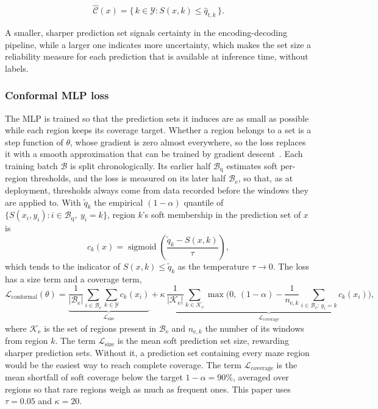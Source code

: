 \documentclass{article}
\begin{document}
\begin{equation}
  \widehat{\mathcal{C}}(x)
  =
  \{\,k\in\mathcal{Y}: S(x,k)\le \hat q_{t,k}\,\}.
\end{equation}

A smaller, sharper prediction set signals certainty in the encoding-decoding pipeline, while a larger one indicates more uncertainty, which makes the set size a reliability measure for each prediction that is available at inference time, without labels.

\subsubsection{Conformal MLP loss}
\label{sec:conformal-loss}
The MLP is trained so that the prediction sets it induces are as small as possible while each region keeps its coverage target. Whether a region belongs to a set is a step function of $\theta$, whose gradient is zero almost everywhere, so the loss replaces it with a smooth approximation that can be trained by gradient descent~\cite{stutz2022}. Each training batch $\mathcal{B}$ is split chronologically. Its earlier half $\mathcal{B}_{\mathrm{q}}$ estimates soft per-region thresholds, and the loss is measured on its later half $\mathcal{B}_{\mathrm{e}}$, so that, as at deployment, thresholds always come from data recorded before the windows they are applied to. With $\tilde q_k$ the empirical $(1-\alpha)$ quantile of $\{S(x_i,y_i): i\in\mathcal{B}_{\mathrm{q}},\ y_i=k\}$, region $k$'s soft membership in the prediction set of $x$ is
\begin{equation}
  c_k(x)=\operatorname{sigmoid}\!\left(\frac{\tilde q_k-S(x,k)}{\tau}\right),
\end{equation}
which tends to the indicator of $S(x,k)\le\tilde q_k$ as the temperature $\tau\to0$. The loss has a size term and a coverage term,
\begin{equation}
  \label{loss:conformal}
  \mathcal{L}_{\mathrm{conformal}}(\theta)
  =
  \underbrace{\frac{1}{|\mathcal{B}_{\mathrm{e}}|}\sum_{i\in\mathcal{B}_{\mathrm{e}}}\sum_{k\in\mathcal{Y}}c_k(x_i)}_{\mathcal{L}_{\mathrm{size}}}
  +
  \kappa\,
  \underbrace{\frac{1}{|\mathcal{K}_{\mathrm{e}}|}\sum_{k\in\mathcal{K}_{\mathrm{e}}}\max\!\Big(0,\,(1-\alpha)-\frac{1}{n_{\mathrm{e},k}}\sum_{i\in\mathcal{B}_{\mathrm{e}}:\,y_i=k}c_{k}(x_i)\Big)}_{\mathcal{L}_{\mathrm{coverage}}},
\end{equation}
where $\mathcal{K}_{\mathrm{e}}$ is the set of regions present in $\mathcal{B}_{\mathrm{e}}$ and $n_{\mathrm{e},k}$ the number of its windows from region $k$. The term $\mathcal{L}_{\mathrm{size}}$ is the mean soft prediction set size, rewarding sharper prediction sets. Without it, a prediction set containing every maze region would be the easiest way to reach complete coverage. The term $\mathcal{L}_{\mathrm{coverage}}$ is the mean shortfall of soft coverage below the target $1-\alpha=90\%$, averaged over regions so that rare regions weigh as much as frequent ones. This paper uses $\tau=0.05$ and $\kappa=20$.
\end{document}
